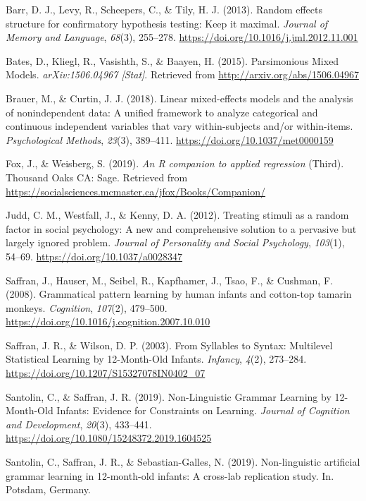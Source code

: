 \begin{appendix}
\begingroup
\setlength{\parindent}{-0.5in}
\setlength{\leftskip}{0.5in}

\hypertarget{refs}{}
\leavevmode\hypertarget{ref-barr2013}{}%
Barr, D. J., Levy, R., Scheepers, C., \& Tily, H. J. (2013). Random
effects structure for confirmatory hypothesis testing: Keep it maximal.
\emph{Journal of Memory and Language}, \emph{68}(3), 255--278.
\url{https://doi.org/10.1016/j.jml.2012.11.001}

\leavevmode\hypertarget{ref-bates2015a}{}%
Bates, D., Kliegl, R., Vasishth, S., \& Baayen, H. (2015). Parsimonious
Mixed Models. \emph{arXiv:1506.04967 {[}Stat{]}}. Retrieved from
\url{http://arxiv.org/abs/1506.04967}

\leavevmode\hypertarget{ref-brauer2018}{}%
Brauer, M., \& Curtin, J. J. (2018). Linear mixed-effects models and the
analysis of nonindependent data: A unified framework to analyze
categorical and continuous independent variables that vary
within-subjects and/or within-items. \emph{Psychological Methods},
\emph{23}(3), 389--411. \url{https://doi.org/10.1037/met0000159}

\leavevmode\hypertarget{ref-fox2019}{}%
Fox, J., \& Weisberg, S. (2019). \emph{An R companion to applied
regression} (Third). Thousand Oaks CA: Sage. Retrieved from
\url{https://socialsciences.mcmaster.ca/jfox/Books/Companion/}

\leavevmode\hypertarget{ref-judd2012}{}%
Judd, C. M., Westfall, J., \& Kenny, D. A. (2012). Treating stimuli as a
random factor in social psychology: A new and comprehensive solution to
a pervasive but largely ignored problem. \emph{Journal of Personality
and Social Psychology}, \emph{103}(1), 54--69.
\url{https://doi.org/10.1037/a0028347}

\leavevmode\hypertarget{ref-saffran2008}{}%
Saffran, J., Hauser, M., Seibel, R., Kapfhamer, J., Tsao, F., \&
Cushman, F. (2008). Grammatical pattern learning by human infants and
cotton-top tamarin monkeys. \emph{Cognition}, \emph{107}(2), 479--500.
\url{https://doi.org/10.1016/j.cognition.2007.10.010}

\leavevmode\hypertarget{ref-saffran2003}{}%
Saffran, J. R., \& Wilson, D. P. (2003). From Syllables to Syntax:
Multilevel Statistical Learning by 12-Month-Old Infants. \emph{Infancy},
\emph{4}(2), 273--284. \url{https://doi.org/10.1207/S15327078IN0402_07}

\leavevmode\hypertarget{ref-santolin2019}{}%
Santolin, C., \& Saffran, J. R. (2019). Non-Linguistic Grammar Learning
by 12-Month-Old Infants: Evidence for Constraints on Learning.
\emph{Journal of Cognition and Development}, \emph{20}(3), 433--441.
\url{https://doi.org/10.1080/15248372.2019.1604525}

\leavevmode\hypertarget{ref-santolin2019a}{}%
Santolin, C., Saffran, J. R., \& Sebastian-Galles, N. (2019).
Non-linguistic artificial grammar learning in 12-month-old infants: A
cross-lab replication study. In. Potsdam, Germany.

\endgroup
\end{appendix}
